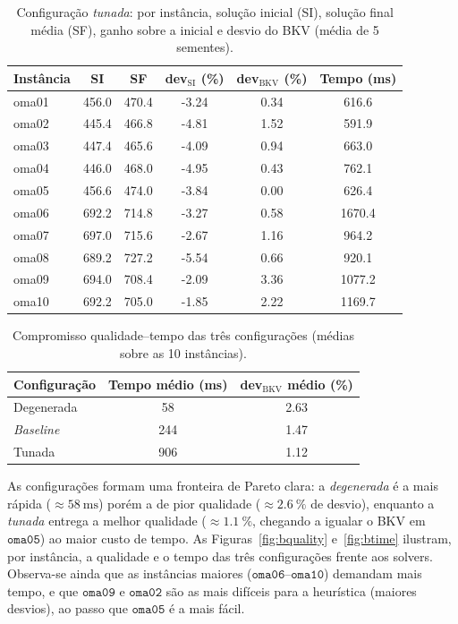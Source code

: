 \documentclass[a4paper,11pt]{article}
\begin{document}
\begin{table}[htbp]
  \centering
  \caption{Configuração \emph{tunada}: por instância, solução inicial (SI), solução final
    média (SF), ganho sobre a inicial e desvio do BKV (média de 5 sementes).}
  \label{tab:tuned}
  \begin{tabular}{l S[table-format=3.1] S[table-format=3.1]
                    S[table-format=-1.2] S[table-format=1.2] S[table-format=4.1]}
    \toprule
    {Instância} & {SI} & {SF} & {dev$_{\text{SI}}$ (\%)} & {dev$_{\text{BKV}}$ (\%)} & {Tempo (ms)} \\
    \midrule
    oma01 & 456.0 & 470.4 & -3.24 & 0.34 & 616.6 \\
    oma02 & 445.4 & 466.8 & -4.81 & 1.52 & 591.9 \\
    oma03 & 447.4 & 465.6 & -4.09 & 0.94 & 663.0 \\
    oma04 & 446.0 & 468.0 & -4.95 & 0.43 & 762.1 \\
    oma05 & 456.6 & 474.0 & -3.84 & 0.00 & 626.4 \\
    oma06 & 692.2 & 714.8 & -3.27 & 0.58 & 1670.4 \\
    oma07 & 697.0 & 715.6 & -2.67 & 1.16 & 964.2 \\
    oma08 & 689.2 & 727.2 & -5.54 & 0.66 & 920.1 \\
    oma09 & 694.0 & 708.4 & -2.09 & 3.36 & 1077.2 \\
    oma10 & 692.2 & 705.0 & -1.85 & 2.22 & 1169.7 \\
    \bottomrule
  \end{tabular}
\end{table}

\begin{table}[htbp]
  \centering
  \caption{Compromisso qualidade--tempo das três configurações (médias sobre as 10
    instâncias).}
  \label{tab:bconf}
  \begin{tabular}{l S[table-format=3.0] S[table-format=1.2]}
    \toprule
    {Configuração} & {Tempo médio (ms)} & {dev$_{\text{BKV}}$ médio (\%)} \\
    \midrule
    Degenerada & 58  & 2.63 \\
    \emph{Baseline} & 244 & 1.47 \\
    Tunada     & 906 & 1.12 \\
    \bottomrule
  \end{tabular}
\end{table}

As configurações formam uma fronteira de Pareto clara: a \emph{degenerada} é a mais rápida
($\approx \SI{58}{\milli\second}$) porém a de pior qualidade ($\approx \SI{2.6}{\percent}$ de
desvio), enquanto a \emph{tunada} entrega a melhor qualidade ($\approx \SI{1.1}{\percent}$,
chegando a igualar o BKV em $\texttt{oma05}$) ao maior custo de tempo. As
Figuras~\ref{fig:bquality} e~\ref{fig:btime} ilustram, por instância, a qualidade e o tempo
das três configurações frente aos solvers. Observa-se ainda que as instâncias maiores
($\texttt{oma06}$--$\texttt{oma10}$) demandam mais tempo, e que $\texttt{oma09}$ e
$\texttt{oma02}$ são as mais difíceis para a heurística (maiores desvios), ao passo que
$\texttt{oma05}$ é a mais fácil.
\end{document}
